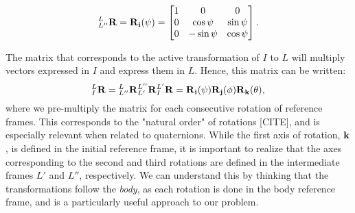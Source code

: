 \begin{equation}
{}_{L''}^{L}\textrm{\textbf{R}} = \textrm{\textbf{R}}_{\textrm{\textbf{i}}}(\psi) = 
\begin{bmatrix}  1& 0  & 0\\
                0 &\cos\psi  &  \sin\psi \\
				0 & -\sin\psi  &  \cos\psi
\end{bmatrix}.
\end{equation}

The matrix that corresponds to the active transformation of $I$ to $L$ will multiply vectors expressed in $I$ and express them in $L$. Hence, this matrix can be written:
\begin{equation}
{}_{I}^{L}\textrm{\textbf{R}} = 
{}_{L''}^{L}\textrm{\textbf{R}}{}_{L'}^{L''}\textrm{\textbf{R}}{}_{I}^{L'}\textrm{\textbf{R}} = \textrm{\textbf{R}}_{\textrm{\textbf{i}}}(\psi)\textrm{\textbf{R}}_{\textrm{\textbf{j}}}(\phi)\textrm{\textbf{R}}_{\textrm{\textbf{k}}}(\theta),
\end{equation}
where we pre-multiply the matrix for each consecutive rotation of reference frames. This corresponds to the "natural order" of rotations [CITE], and is especially relevant when related to quaternions. While the first axis of rotation, $\textrm{\textbf{k}}$, is defined in the initial reference frame, it is important to realize that the axes corresponding to the second and third rotations are defined in the intermediate frames $L'$ and $L''$, respectively. We can understand this by thinking that the transformations follow the \textit{body}, as each rotation is done in the body reference frame, and is a particularly useful approach to our problem.


\def\rvec{0.8}





